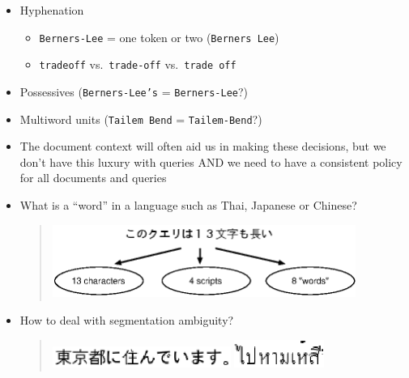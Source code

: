 \documentclass[a4paper,landscape,headrule,footrule,xetex]{foils}
\begin{document}
\begin{itemize}
\item Hyphenation
  \begin{itemize}
  \item \texttt{Berners-Lee} = one token or two (\texttt{Berners Lee})
  \item \texttt{tradeoff} vs.\ \texttt{trade-off} vs.\ \texttt{trade off}
  \end{itemize}
\item Possessives (\texttt{Berners-Lee's} = \texttt{Berners-Lee}?)
\item Multiword units (\texttt{Tailem Bend} = \texttt{Tailem-Bend}?)
\item The document context will often aid us in making these decisions,
  but we don't have this luxury with queries AND we need to have a
  consistent policy for all documents and queries
\end{itemize}








\begin{itemize}
\item What is a ``word'' in a language such as Thai, Japanese or Chinese?
\begin{quote}
  \includegraphics[width=0.85\textwidth]{../pics/tokenisation-japanese.eps}
\end{quote}
\item How to deal with segmentation ambiguity?
\begin{quote}
  \includegraphics[width=0.5\textwidth]{../pics/tokenisation-japanese-ambiguity.eps}
  \hfill
  \includegraphics[width=0.25\textwidth]{../pics/tokenisation-thai-ambiguity.eps}
\end{quote}
\end{itemize}
\end{document}

